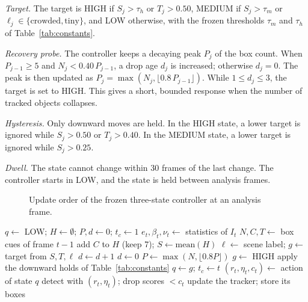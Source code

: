\emph{Target.} The target is HIGH if $S_j>\tau_h$ or $T_j>0.50$, MEDIUM if
$S_j>\tau_m$ or $\ell_j\in\{\text{crowded},\text{tiny}\}$, and LOW otherwise,
with the frozen thresholds $\tau_m$ and $\tau_h$ of Table~\ref{tab:constants}.

\emph{Recovery probe.} The controller keeps a decaying peak $P_j$ of the box
count. When $P_{j-1}\geq5$ and $N_j<0.40\,P_{j-1}$, a drop age $d_j$ is
increased; otherwise $d_j=0$. The peak is then updated as
$P_j=\max(N_j,\lfloor 0.8\,P_{j-1}\rfloor)$. While $1\leq d_j\leq3$, the
target is set to HIGH. This gives a short, bounded response when the number
of tracked objects collapses.

\emph{Hysteresis.} Only downward moves are held. In the HIGH state, a lower
target is ignored while $S_j>0.50$ or $T_j>0.40$. In the MEDIUM state, a lower
target is ignored while $S_j>0.25$.

\emph{Dwell.} The state cannot change within 30 frames of the last change.
The controller starts in LOW, and the state is held between analysis frames.

\begin{figure}[t]
\centering

\caption{Update order of the frozen three-state controller at an analysis
frame.}
\label{fig:state}
\end{figure}

\begin{algorithm}[t]
\caption{Frozen AC-MOT controller for one sequence}\label{alg:controller}
\begin{algorithmic}[1]
\State $q\gets$ LOW; $H\gets\emptyset$; $P,d\gets0$; $t_c\gets1$
    \State $e_t,\beta_t,\nu_t\gets$ statistics of $I_t$
    \State $N,C,T\gets$ box cues of frame $t-1$
    \State add $C$ to $H$ (keep 7); $S\gets\mathrm{mean}(H)$
    \State $\ell\gets$ scene label; $g\gets$ target from $S,T,\ell$
     $d\gets d+1$
    \Else{} $d\gets0$
    \EndIf
    \State $P\gets\max(N,\lfloor0.8P\rfloor)$
     $g\gets$ HIGH
    \EndIf
    \State apply the downward holds of Table~\ref{tab:constants}
      \State $q\gets g$; $t_c\gets t$
    \EndIf
  \EndIf
  \State $(r_t,\eta_t,c_t)\gets$ action of state $q$
  \State detect with $(r_t,\eta_t)$; drop scores $<c_t$
  \State update the tracker; store its boxes
\EndFor
\end{algorithmic}
\end{algorithm}

